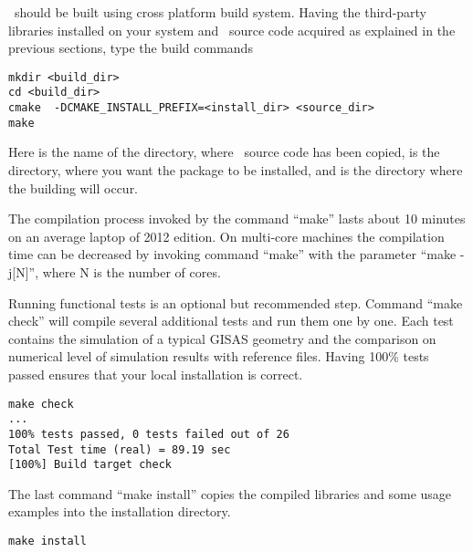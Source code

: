 \BornAgain\ should be built using  cross platform build system. 
Having the third-party libraries installed on your system and
\BornAgain\ source code acquired as explained in the
previous sections, type the build commands
\begin{lstlisting}[language=shell, style=commandline]
mkdir <build_dir>
cd <build_dir>
cmake  -DCMAKE_INSTALL_PREFIX=<install_dir> <source_dir>
make
\end{lstlisting}
\vspace*{3mm}

Here  is the name of the directory, where \BornAgain\ source code has been
copied,  is the directory, where you want the package
to be installed, and  is the directory where the building will occur.



The compilation process invoked by the command ``make'' lasts about 10 minutes on an average laptop
of 2012 edition. On multi-core machines the compilation time  can be decreased by invoking command
``make'' with the parameter ``make -j[N]'', where N is the number of cores.

Running functional tests is an optional but recommended step. Command ``make check''
will compile several additional tests and run them one by one. Each test contains
the simulation of a typical GISAS geometry and the comparison on numerical level of simulation results with reference files. Having 100\% tests passed ensures that your local installation
is correct.
\begin{lstlisting}[language=shell, style=commandline]
make check
...
100% tests passed, 0 tests failed out of 26
Total Test time (real) = 89.19 sec
[100%] Build target check
\end{lstlisting}
\vspace*{3mm}


The last command ``make install'' copies the compiled libraries and some usage examples
into  the installation directory.
\begin{lstlisting}[language=shell, style=commandline]
make install
\end{lstlisting}

